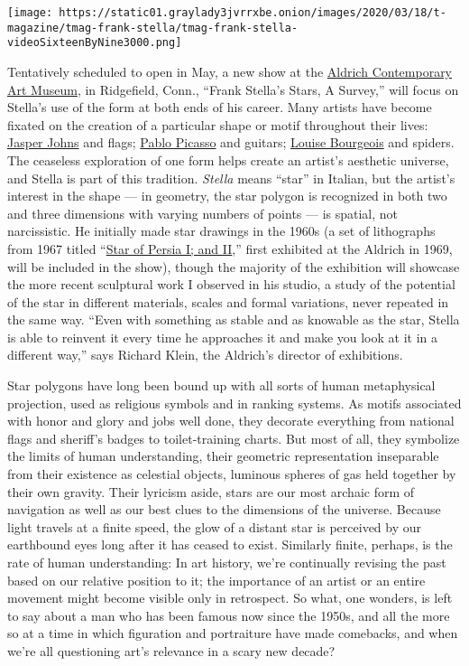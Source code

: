 \texttt{[image: https://static01.graylady3jvrrxbe.onion/images/2020/03/18/t-magazine/tmag-frank-stella/tmag-frank-stella-videoSixteenByNine3000.png]}

Tentatively scheduled to open in May, a new show at the
\href{http://aldrichart.org/}{Aldrich Contemporary Art Museum}, in
Ridgefield, Conn., ``Frank Stella's Stars, A Survey,'' will focus on
Stella's use of the form at both ends of his career. Many artists have
become fixated on the creation of a particular shape or motif throughout
their lives:
\href{https://www.nytimes3xbfgragh.onion/2019/02/18/t-magazine/jasper-johns.html}{Jasper
Johns} and flags;
\href{https://www.nytimes3xbfgragh.onion/2019/06/11/t-magazine/francoise-gilot-picasso.html}{Pablo
Picasso} and guitars;
\href{https://www.nytimes3xbfgragh.onion/2016/10/03/t-magazine/art/louise-bourgeois-turning-inwards.html}{Louise
Bourgeois} and spiders. The ceaseless exploration of one form helps
create an artist's aesthetic universe, and Stella is part of this
tradition. \emph{Stella} means ``star'' in Italian, but the artist's
interest in the shape --- in geometry, the star polygon is recognized in
both two and three dimensions with varying numbers of points --- is
spatial, not narcissistic. He initially made star drawings in the 1960s
(a set of lithographs from 1967 titled
``\href{https://www.artsy.net/artwork/frank-stella-star-of-persia-i-and-ii}{Star
of Persia I; and II},'' first exhibited at the Aldrich in 1969, will be
included in the show), though the majority of the exhibition will
showcase the more recent sculptural work I observed in his studio, a
study of the potential of the star in different materials, scales and
formal variations, never repeated in the same way. ``Even with something
as stable and as knowable as the star, Stella is able to reinvent it
every time he approaches it and make you look at it in a different
way,'' says Richard Klein, the Aldrich's director of exhibitions.

Star polygons have long been bound up with all sorts of human
metaphysical projection, used as religious symbols and in ranking
systems. As motifs associated with honor and glory and jobs well done,
they decorate everything from national flags and sheriff's badges to
toilet-training charts. But most of all, they symbolize the limits of
human understanding, their geometric representation inseparable from
their existence as celestial objects, luminous spheres of gas held
together by their own gravity. Their lyricism aside, stars are our most
archaic form of navigation as well as our best clues to the dimensions
of the universe. Because light travels at a finite speed, the glow of a
distant star is perceived by our earthbound eyes long after it has
ceased to exist. Similarly finite, perhaps, is the rate of human
understanding: In art history, we're continually revising the past based
on our relative position to it; the importance of an artist or an entire
movement might become visible only in retrospect. So what, one wonders,
is left to say about a man who has been famous now since the 1950s, and
all the more so at a time in which figuration and portraiture have made
comebacks, and when we're all questioning art's relevance in a scary new
decade?

